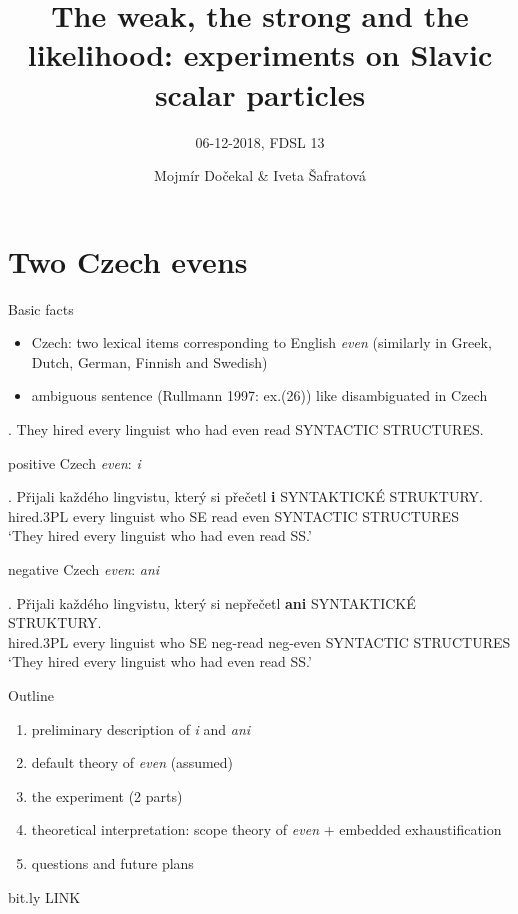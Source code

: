 \documentclass[ignorenonframetext,]{beamer}
\title{The	weak,	the	strong	and	the	
likelihood:	experiments	on	Slavic	
scalar	particles}
\subtitle{06-12-2018, FDSL 13}
\author{Mojmír Dočekal \& Iveta Šafratová}
\date{}
\providecommand{\tightlist}{%
  \setlength{\itemsep}{0pt}\setlength{\parskip}{0pt}}
\begin{document}
\frame{\titlepage}

\section{Two Czech evens}\label{two-czech-evens}

\begin{frame}{Basic facts}

\begin{itemize}
\tightlist
\item Czech: two lexical items corresponding to English \emph{even}
  (similarly in Greek, Dutch, German, Finnish and Swedish)
\item
  ambiguous sentence (Rullmann 1997: ex.(26)) like \Next disambiguated
  in Czech
\end{itemize}

\ex. They hired every linguist who had even read SYNTACTIC STRUCTURES.

\end{frame}

\begin{frame}

positive Czech \emph{even}: \emph{i}

\exg. Přijali každého lingvistu, který si přečetl \textbf{i} SYNTAKTICKÉ
STRUKTURY.\\
hired.3PL every linguist who SE read even SYNTACTIC STRUCTURES\\
`They hired every linguist who had even read SS.'

negative Czech \emph{even}: \emph{ani}

\exg. Přijali každého lingvistu, který si nepřečetl \textbf{ani}
SYNTAKTICKÉ STRUKTURY.\\
hired.3PL every linguist who SE neg-read neg-even SYNTACTIC STRUCTURES\\
`They hired every linguist who had even read SS.'

\end{frame}


\begin{frame}{Outline}

\begin{enumerate}
\def\labelenumi{\arabic{enumi})}
\tightlist
\item
  preliminary description of \emph{i} and \emph{ani}
\item
  default theory of \emph{even} (assumed)
\item
  the experiment (2 parts)
\item
  theoretical interpretation: scope theory of \emph{even} + embedded
  exhaustification
\item
  questions and future plans
\end{enumerate}

bit.ly LINK

\end{frame}
\end{document}
